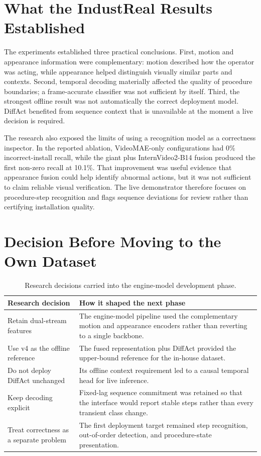 \section{What the IndustReal Results Established}

The experiments established three practical conclusions. First, motion and
appearance information were complementary: motion described how the operator
was acting, while appearance helped distinguish visually similar parts and
contexts. Second, temporal decoding materially affected the quality of
procedure boundaries; a frame-accurate classifier was not sufficient by
itself. Third, the strongest offline result was not automatically the correct
deployment model. DiffAct benefited from sequence context that is unavailable
at the moment a live decision is required.

The research also exposed the limits of using a recognition model as a
correctness inspector. In the reported ablation, VideoMAE-only configurations
had 0\% incorrect-install recall, while the giant plus InternVideo2-B14 fusion
produced the first non-zero recall at 10.1\%. That improvement was useful
evidence that appearance fusion could help identify abnormal actions, but it
was not sufficient to claim reliable visual verification. The live
demonstrator therefore focuses on procedure-step recognition and flags
sequence deviations for review rather than certifying installation quality.

\section{Decision Before Moving to the Own Dataset}

\begin{table}[H]
\centering
\small
\begin{tabularx}{\textwidth}{@{}p{}X@{}}
\toprule
\textbf{Research decision} & \textbf{How it shaped the next phase} \\
\midrule
Retain dual-stream features & The engine-model pipeline used the complementary
motion and appearance encoders rather than reverting to a single backbone. \\
Use v4 as the offline reference & The fused representation plus DiffAct
provided the upper-bound reference for the in-house dataset. \\
Do not deploy DiffAct unchanged & Its offline context requirement led to a
causal temporal head for live inference. \\
Keep decoding explicit & Fixed-lag sequence commitment was retained so that
the interface would report stable steps rather than every transient class
change. \\
Treat correctness as a separate problem & The first deployment target remained
step recognition, out-of-order detection, and procedure-state presentation. \\
\bottomrule
\end{tabularx}
\caption{Research decisions carried into the engine-model development phase.}
\label{tab:research-decisions}
\end{table}

